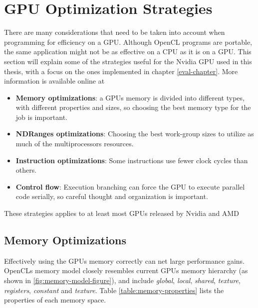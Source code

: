 \section{GPU Optimization Strategies}

There are many considerations that need to be taken into account when
programming for efficiency on a GPU. Although OpenCL programs are
portable, the same application might not be as effective on a CPU as
it is on a GPU. This section will explain some of the strategies
useful for the Nvidia GPU used in this thesis, with a focus on the
ones implemented in chapter \ref{eval-chapter}. More information is
available online at \cite{nvidia-best-practice}

\begin{itemize}

\item \textbf{Memory optimizations}: a GPUs memory is divided into different
  types, with different properties and sizes, so choosing the best
  memory type for the job is important.

\item \textbf{NDRanges optimizations}: Choosing the best work-group
  sizes to utilize as much of the multiprocessors resources.

\item \textbf{Instruction optimizations}: Some instructions use fewer
  clock cycles than others.

\item \textbf{Control flow}: Execution branching can force the GPU to
  execute parallel code serially, so careful thought and organization
  is important.

\end{itemize}

These strategies applies to at least most GPUs released by Nvidia and
AMD


\subsection{Memory Optimizations}

Effectively using the GPUs memory correctly can net large performance
gains. OpenCLs memory model closely resembles current GPUs memory
hierarchy (as shown in \ref{fig:memory-model-figure}), and include
\textit{global}, \textit{local}, \textit{shared}, \textit{texture},
\textit{registers}, \textit{constant} and \textit{texture}. Table
\ref{table:memory-properties} lists the properties of each memory
space.

